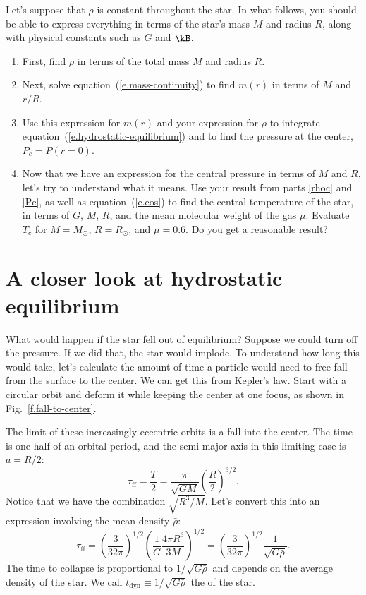 \begin{exercisebox}
\label{ex.constant-density-star}
Let's suppose that $\rho$ is constant throughout the star. 
In what follows, you should be able to express everything in terms of the star's mass $M$ and radius $R$, along with physical constants such as $G$ and $\kB$.

\begin{enumerate}
\item\label{rhoc} First, find $\rho$ in terms of the total mass $M$ and radius $R$.

\item Next, solve equation~(\ref{e.mass-continuity}) to find $m(r)$ in terms of $M$ and $r/R$.

\item\label{Pc} Use this expression for $m(r)$ and your expression for $\rho$ to integrate equation~(\ref{e.hydrostatic-equilibrium}) and to find the pressure at the center, $P_{c} = P(r=0)$.

\item
Now that we have an expression for the central pressure in terms of $M$ and $R$, let's try to understand what it means. Use your result from parts \ref{rhoc} and \ref{Pc}, as well as equation~(\ref{e.eos}) to find the central temperature of the star, in terms of $G$, $M$, $R$, and the mean molecular weight of the gas $\mu$.  Evaluate $T_{c}$ for $M=M_{\odot}$, $R=R_{\odot}$, and $\mu = 0.6$.  Do you get a reasonable result?
\end{enumerate}
\end{exercisebox}

\section{A closer look at hydrostatic equilibrium}
\label{s.closer-look}

What would happen if the star fell out of equilibrium? Suppose we could turn off the pressure. If we did that, the star would implode. To understand how long this would take, let's calculate the amount of time a particle would need to free-fall from the surface to the center.  We can get this from Kepler's law. Start with a circular orbit and deform it while keeping the center at one focus, as shown in Fig.~\ref{f.fall-to-center}.  

The limit of these increasingly eccentric orbits is a fall into the center.  The time is one-half of an orbital period, and the semi-major axis in this limiting case is $a = R/2$:
\[
\tau_{\mathrm{ff}} = \frac{T}{2} = \frac{\pi}{\sqrt{GM}} \left(\frac{R}{2}\right)^{3/2}.
\]
Notice that we have the combination $\sqrt{R^{3}/M}$.  Let's convert this into an expression involving the mean density $\bar{\rho}$:
\begin{equation}\label{e.tff}
\tau_{\mathrm{ff}} = \left(\frac{3}{32\pi}\right)^{1/2}\left(\frac{1}{G}\frac{4\pi R^{3}}{3M}\right)^{1/2} = \left(\frac{3}{32\pi}\right)^{1/2} \frac{1}{\sqrt{G\bar{\rho}}}.
\end{equation}
The time to collapse is proportional to $1/\sqrt{G\bar{\rho}}$ and depends on the average density of the star. We call $t_{\mathrm{dyn}} \equiv 1/\sqrt{G\bar{\rho}}$ the  of the star.

